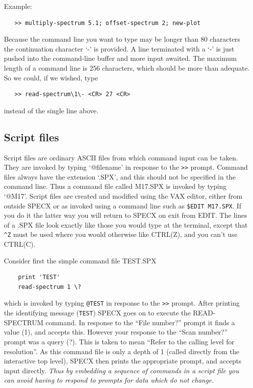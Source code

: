 \documentclass[11pt,twoside]{report}
\begin{document}
Example:
\begin{verbatim}
   >> multiply-spectrum 5.1; offset-spectrum 2; new-plot
\end{verbatim}

Because the command line you want to type may be longer than 80
characters the continuation
character `-' is provided. A line terminated with a `-' is just pushed
into the command-line buffer
and more input awaited. The maximum length of a command line is 256
characters, which should be more than adequate. So we could, if we
wished, type
\begin{verbatim}
   >> read-spectrum\1\- <CR> 27 <CR>
\end{verbatim}
instead of the single line above.

\subsection{Script files}

Script files are ordinary ASCII files from which command input can be
taken. They are invoked by typing `@filename' in response to the
\verb+>>+ prompt. Command files always have the extension
`.SPX', and this should not be specified in the
command line. Thus a command file called M17.SPX is invoked by typing
`@M17'.  Script files are created and modified using the VAX
editor, either from outside SPECX or as invoked
using a command line such as \verb+$EDIT M17.SPX+. If you do it the
latter way you will return to SPECX on exit from EDIT. The lines of a
.SPX file look exactly like those you would type at the terminal,
except that
\verb+^Z+  must be used where you would otherwise like CTRL(Z),
and you can't use CTRL(C).

Consider first the simple command file TEST.SPX
\begin{verbatim}
    print 'TEST'
    read-spectrum 1 \?
\end{verbatim}
which is invoked by typing \verb+@TEST+ in response to the \verb+>>+ prompt.
After printing the identifying message (\verb+TEST+) SPECX goes on to
execute the READ-SPECTRUM command. In response to the ``File number?''
prompt it finds a value (1), and accepts this. However your response to the
``Scan number?'' prompt was a query (?). This is taken to mean ``Refer to the
calling level for resolution''. As this command file is only a depth of
1 (\ie called directly from the interactive top level), SPECX then prints the
appropriate prompt, and accepts input directly. {\em Thus by embedding a sequence
of commands in a script file you can avoid having to respond to
prompts for data which do not change.}
\end{document}
